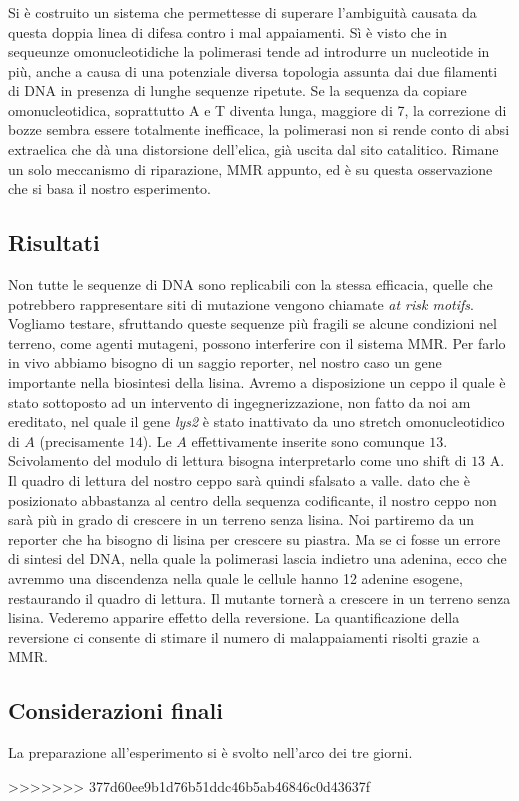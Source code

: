  \subsubsection*{}
 Si è costruito un sistema che permettesse di superare l'ambiguità causata da questa doppia linea di difesa contro i mal appaiamenti. 
Sì è visto che in sequeunze omonucleotidiche la polimerasi tende ad introdurre un nucleotide in più, anche a causa di una potenziale diversa topologia assunta dai due filamenti di DNA in presenza di lunghe sequenze ripetute. 
Se la sequenza da copiare omonucleotidica, soprattutto A e T diventa lunga, maggiore di 7, la correzione di bozze sembra essere totalmente inefficace, la polimerasi non si rende conto di absi extraelica che dà una distorsione dell'elica, già uscita dal sito catalitico. 
Rimane un solo meccanismo di riparazione, MMR appunto, ed è su questa osservazione che si basa il nostro esperimento. 

 
 \subsection*{Risultati}
 Non tutte le sequenze di DNA sono replicabili con la stessa efficacia, quelle che potrebbero rappresentare siti di mutazione vengono chiamate \textit{at risk motifs}. 
 Vogliamo testare, sfruttando queste sequenze più fragili se alcune condizioni nel terreno, come agenti mutageni, possono interferire con il sistema MMR. 
Per farlo in vivo abbiamo bisogno di un saggio reporter, nel nostro caso un gene importante nella biosintesi della lisina. 
Avremo a disposizione un ceppo il quale è stato sottoposto ad un intervento di ingegnerizzazione, non fatto da noi am ereditato, nel quale il gene \emph{lys2} è stato inattivato da uno stretch omonucleotidico di $A$ (precisamente $14$). 
Le $A$ effettivamente inserite sono comunque $13$. 
Scivolamento del modulo di lettura bisogna interpretarlo come uno shift di $13$ A. 
Il quadro di lettura del nostro ceppo sarà quindi sfalsato a valle. 
dato che è posizionato abbastanza al centro della sequenza codificante, il nostro ceppo non sarà più in grado di crescere in un terreno senza lisina. 
Noi partiremo da un reporter che ha bisogno di lisina per crescere su piastra. 
Ma se ci fosse un errore di sintesi del DNA, nella quale la polimerasi lascia indietro una adenina, ecco che avremmo una discendenza nella quale le cellule hanno 12 adenine esogene, restaurando il quadro di lettura. 
Il mutante tornerà a crescere in un terreno senza lisina. 
Vederemo apparire effetto della reversione. 
La quantificazione della reversione ci consente di stimare il numero di malappaiamenti risolti grazie a MMR.
 
 \subsection*{Considerazioni finali}
 La preparazione all'esperimento si è svolto nell'arco dei tre giorni. 

>>>>>>> 377d60ee9b1d76b51ddc46b5ab46846c0d43637f
